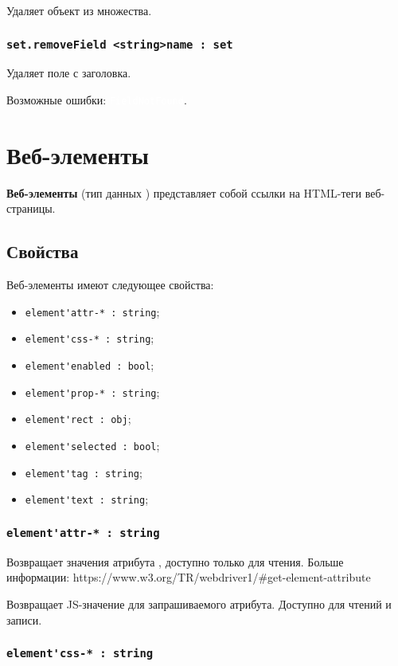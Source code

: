 \documentclass[a4paper, 14pt]{extarticle}
\newcommand{\ferror}[1]{{\fontsize{11pt}{12pt} \tt \colorbox{function}{\textcolor{white}{#1}}}}
\newenvironment{icItems}
	{ \begin{itemize} [noitemsep,nolistsep] }
	{ \end{itemize} }
\begin{document}
Удаляет объект  из множества.

\subsubsection{\lstinline|set.removeField <string>name : set|}

Удаляет поле  с заголовка.

Возможные ошибки: \ferror{FieldNotFound}.

\newpage
\section{Веб-элементы}
\label{webelments}

{\bf Веб-элементы} (тип данных \element) представляет собой ссылки на HTML-теги веб-страницы.

\subsection{Свойства}

Веб-элементы имеют следующее свойства:
\begin{icItems}
\item \lstinline|element'attr-* : string|;
\item \lstinline|element'css-* : string|;
\item \lstinline|element'enabled : bool|;
\item \lstinline|element'prop-* : string|;
\item \lstinline|element'rect : obj|;
\item \lstinline|element'selected : bool|;
\item \lstinline|element'tag : string|;
\item \lstinline|element'text : string|;
\end{icItems} 

\subsubsection{\lstinline|element'attr-* : string|}

\code{[w3c]} Возвращает значения атрибута \code{*}, доступно только для чтения. Больше информации: https://www.w3.org/TR/webdriver1/\#get-element-attribute

\code{[icL]} Возвращает JS-значение для запрашиваемого атрибута. Доступно для чтений и записи.

\subsubsection{\lstinline|element'css-* : string|}
\end{document}
